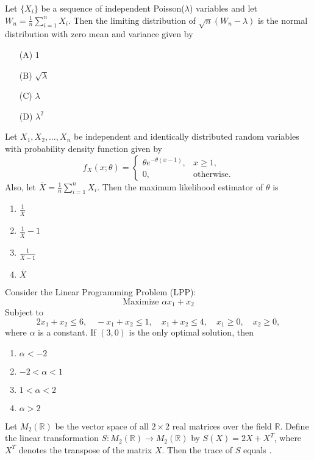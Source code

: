 \item Let \( \{X_i\} \) be a sequence of independent Poisson(\(\lambda\)) variables and let \( W_n = \frac{1}{n} \sum_{i=1}^n X_i \). Then the limiting distribution of \( \sqrt{n}(W_n - \lambda) \) is the normal distribution with zero mean and variance given by
\begin{multicols}{2}
\begin{enumerate}
    \item[(A)] 1
    \item[(B)] \(\sqrt{\lambda}\)
    \item[(C)] \(\lambda\)
    \item[(D)] \(\lambda^2\)
\end{enumerate}
\end{multicols}
\vspace{0.5cm}
\item Let $X_1, X_2, \dots, X_n$ be independent and identically distributed random variables with probability density function given by
\[
f_X(x; \theta) = 
\begin{cases}
\theta e^{-\theta (x - 1)}, & x \geq 1, \\
0, & \text{otherwise}.
\end{cases}
\]
Also, let $\overline{X} = \frac{1}{n} \sum_{i=1}^n X_i$. Then the maximum likelihood estimator of $\theta$ is
\begin{multicols}{2}
    \begin{enumerate}
        \item $\frac{1}{\overline{X}}$
        \item $\frac{1}{\overline{X}}-1$
        \item $\frac{1}{\overline{X}-1}$
        \item $\overline{X}$
    \end{enumerate}
\end{multicols}
\vspace{0.5cm}
\item Consider the Linear Programming Problem (LPP):  
\[
\text{Maximize } \alpha x_1 + x_2
\]
Subject to  
\[
2x_1 + x_2 \leq 6, \quad -x_1 + x_2 \leq 1, \quad x_1 + x_2 \leq 4, \quad x_1 \geq 0, \quad x_2 \geq 0,
\]
where $\alpha$ is a constant. If $(3, 0)$ is the only optimal solution, then
\begin{multicols}{2}
    \begin{enumerate}
        \item $\alpha<-2$
        \item $-2<\alpha<1$
        \item $1<\alpha<2$
        \item $\alpha>2$
    \end{enumerate}
\end{multicols}
\item Let $M_2(\mathbb{R})$ be the vector space of all $2 \times 2$ real matrices over the field $\mathbb{R}$. Define the linear transformation $S : M_2(\mathbb{R}) \to M_2(\mathbb{R})$ by $S(X) = 2X + X^T$, where $X^T$ denotes the transpose of the matrix $X$. Then the trace of $S$ equals \underline{\hspace{2cm}}.

